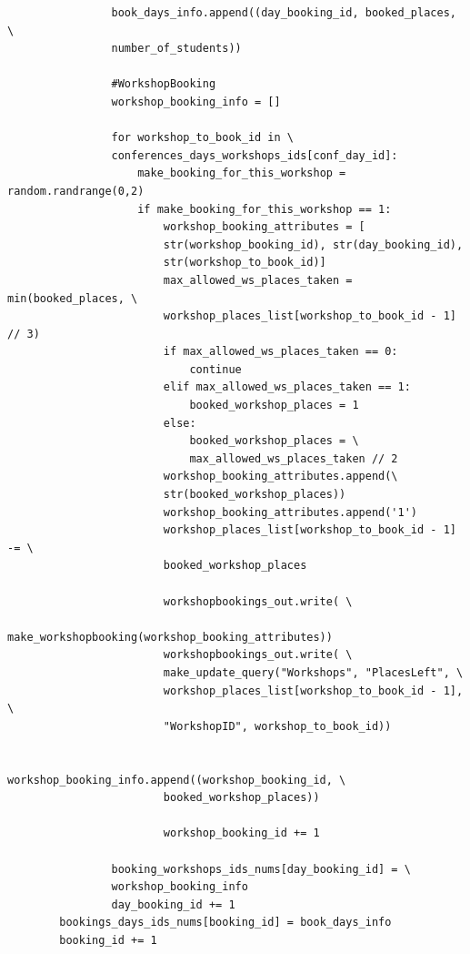 \documentclass[12pt, a4paper]{mwrep}
\begin{document}
\begin{lstlisting}
                book_days_info.append((day_booking_id, booked_places, \
                number_of_students))
                
                #WorkshopBooking
                workshop_booking_info = []
                
                for workshop_to_book_id in \
                conferences_days_workshops_ids[conf_day_id]:
                    make_booking_for_this_workshop = random.randrange(0,2)
                    if make_booking_for_this_workshop == 1:
                        workshop_booking_attributes = [
                        str(workshop_booking_id), str(day_booking_id),
                        str(workshop_to_book_id)]
                        max_allowed_ws_places_taken = min(booked_places, \
                        workshop_places_list[workshop_to_book_id - 1] // 3)
                        if max_allowed_ws_places_taken == 0:
                            continue
                        elif max_allowed_ws_places_taken == 1:
                            booked_workshop_places = 1
                        else:
                            booked_workshop_places = \
                            max_allowed_ws_places_taken // 2
                        workshop_booking_attributes.append(\
                        str(booked_workshop_places))
                        workshop_booking_attributes.append('1')
                        workshop_places_list[workshop_to_book_id - 1] -= \
                        booked_workshop_places

                        workshopbookings_out.write( \
                         make_workshopbooking(workshop_booking_attributes))
                        workshopbookings_out.write( \
                        make_update_query("Workshops", "PlacesLeft", \
                        workshop_places_list[workshop_to_book_id - 1], \
                        "WorkshopID", workshop_to_book_id))                        
                        
                        workshop_booking_info.append((workshop_booking_id, \
                        booked_workshop_places))
                        
                        workshop_booking_id += 1
                
                booking_workshops_ids_nums[day_booking_id] = \
                workshop_booking_info
                day_booking_id += 1
        bookings_days_ids_nums[booking_id] = book_days_info
        booking_id += 1


\end{lstlisting}
\end{document}
